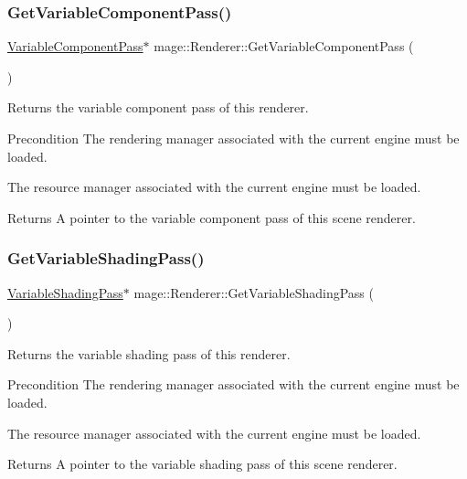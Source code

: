 \subsubsection{\texorpdfstring{Get\+Variable\+Component\+Pass()}{GetVariableComponentPass()}}
{\footnotesize\ttfamily \hyperlink{classmage_1_1_variable_component_pass}{Variable\+Component\+Pass}$\ast$ mage\+::\+Renderer\+::\+Get\+Variable\+Component\+Pass (\begin{DoxyParamCaption}{ }\end{DoxyParamCaption})}

Returns the variable component pass of this renderer.

\begin{DoxyPrecond}{Precondition}
The rendering manager associated with the current engine must be loaded. 

The resource manager associated with the current engine must be loaded. 
\end{DoxyPrecond}
\begin{DoxyReturn}{Returns}
A pointer to the variable component pass of this scene renderer. 
\end{DoxyReturn}
\hypertarget{classmage_1_1_renderer_aaea6458a480c62f8b0b911f16e5058b9}{}\label{classmage_1_1_renderer_aaea6458a480c62f8b0b911f16e5058b9} 
\subsubsection{\texorpdfstring{Get\+Variable\+Shading\+Pass()}{GetVariableShadingPass()}}
{\footnotesize\ttfamily \hyperlink{classmage_1_1_variable_shading_pass}{Variable\+Shading\+Pass}$\ast$ mage\+::\+Renderer\+::\+Get\+Variable\+Shading\+Pass (\begin{DoxyParamCaption}{ }\end{DoxyParamCaption})}

Returns the variable shading pass of this renderer.

\begin{DoxyPrecond}{Precondition}
The rendering manager associated with the current engine must be loaded. 

The resource manager associated with the current engine must be loaded. 
\end{DoxyPrecond}
\begin{DoxyReturn}{Returns}
A pointer to the variable shading pass of this scene renderer. 
\end{DoxyReturn}
\hypertarget{classmage_1_1_renderer_a8069fab64b56b69dca3d9a8a5ebc3f8e}{}\label{classmage_1_1_renderer_a8069fab64b56b69dca3d9a8a5ebc3f8e} 
